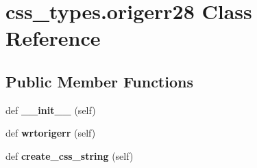 \hypertarget{classcss__types_1_1origerr28}{}\section{css\+\_\+types.\+origerr28 Class Reference}
\label{classcss__types_1_1origerr28}
\subsection*{Public Member Functions}
\begin{DoxyCompactItemize}
\item 
\hypertarget{classcss__types_1_1origerr28_abeaef752b72e98c41cdadbe795a339ac}{}def {\bfseries \+\_\+\+\_\+init\+\_\+\+\_\+} (self)\label{classcss__types_1_1origerr28_abeaef752b72e98c41cdadbe795a339ac}

\item 
\hypertarget{classcss__types_1_1origerr28_a3f72b07a2bdcf07ea39090a125e28f26}{}def {\bfseries wrtorigerr} (self)\label{classcss__types_1_1origerr28_a3f72b07a2bdcf07ea39090a125e28f26}

\item 
\hypertarget{classcss__types_1_1origerr28_a2525b3947457c0c0420c320850a9714f}{}def {\bfseries create\+\_\+css\+\_\+string} (self)\label{classcss__types_1_1origerr28_a2525b3947457c0c0420c320850a9714f}

\end{DoxyCompactItemize}
